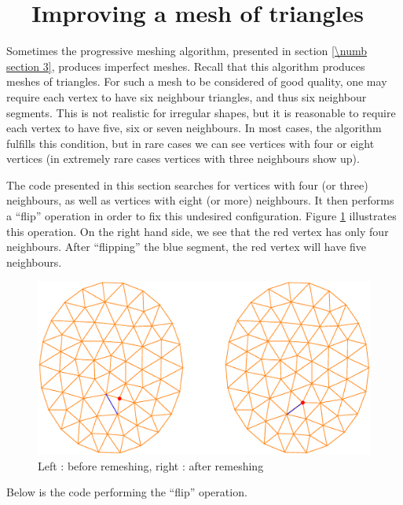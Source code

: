 \section{~~Improving a mesh of triangles}\label{\numb section 10.\numb parag 4}

Sometimes the progressive meshing algorithm, presented in section \ref{\numb section 3},
produces imperfect meshes.
Recall that this algorithm produces meshes of triangles.
For such a mesh to be considered of good quality, one may require each vertex
to have six neighbour triangles, and thus six neighbour segments.
This is not realistic for irregular shapes, but it is reasonable to require each vertex
to have five, six or seven neighbours.
In most cases, the algorithm fulfills this condition, but in rare cases we can see vertices
with four or eight vertices (in extremely rare cases vertices with three neighbours show up).

The code presented in this section searches for vertices with four (or three) neighbours,
as well as vertices with eight (or more) neighbours.
It then performs a ``flip'' operation in order to fix this undesired configuration.
Figure \ref{\numb section 10.\numb fig 2} illustrates this operation.
On the right hand side, we see that the red vertex has only four neighbours.
After ``flipping'' the blue segment, the red vertex will have five neighbours.

\begin{figure}[ht] \centering
  \includegraphics[width=127mm]{two-ellipses}
  \caption{Left : before remeshing, right : after remeshing}
  \label{\numb section 10.\numb fig 2}
\end{figure}

Below is the code performing the ``flip'' operation.

